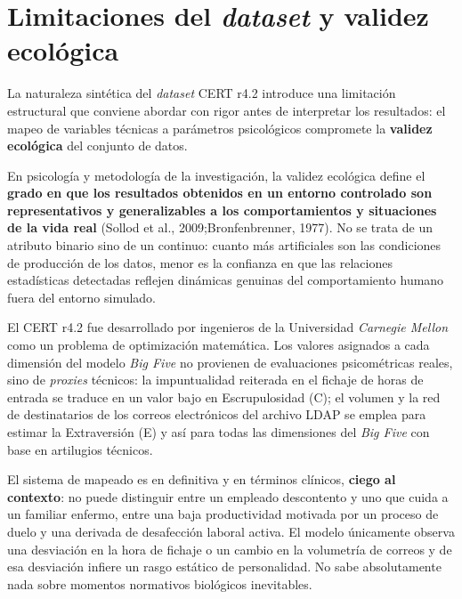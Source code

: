 \documentclass[IB]{TFUOC}%
\begin{document}
\section{Limitaciones del \textit{dataset} y validez ecológica}

La naturaleza sintética del \textit{dataset} CERT r4.2 introduce una limitación 
estructural que conviene abordar con rigor antes de interpretar los resultados: 
el mapeo de variables técnicas a parámetros psicológicos compromete la 
\textbf{validez ecológica} del conjunto de datos.

\medskip
\noindent En psicología y metodología de la investigación, la validez ecológica 
define el \textbf{grado en que los resultados obtenidos en un entorno controlado 
son representativos y generalizables a los comportamientos y situaciones de la 
vida real} (Sollod et al., 2009;Bronfenbrenner, 1977). No se trata de un atributo binario sino de un continuo: cuanto más artificiales son las condiciones de producción de los datos, 
menor es la confianza en que las relaciones estadísticas detectadas reflejen 
dinámicas genuinas del comportamiento humano fuera del entorno simulado.

\medskip
\noindent El CERT r4.2 fue desarrollado por ingenieros de la Universidad 
\textit{Carnegie Mellon} como un problema de optimización matemática. Los valores 
asignados a cada dimensión del modelo \textit{Big Five} no provienen de 
evaluaciones psicométricas reales, sino de \textit{proxies} técnicos: la impuntualidad 
reiterada en el fichaje de horas de entrada se traduce en un valor bajo en Escrupulosidad (C); 
el volumen y la red de destinatarios de los correos electrónicos del archivo 
LDAP se emplea para estimar la Extraversión (E) y así para todas las dimensiones del \textit{Big Five} con base en artilugios técnicos. 

\medskip
\noindent El sistema de mapeado es en definitiva y 
en términos clínicos, \textbf{ciego al contexto}: no puede distinguir entre 
un empleado descontento y uno que cuida a un familiar enfermo, entre una 
baja productividad motivada por un proceso de duelo y una derivada de 
desafección laboral activa. El modelo únicamente observa una desviación 
en la hora de fichaje o un cambio en la volumetría de correos y de esa 
desviación infiere un rasgo estático de personalidad. No sabe absolutamente nada sobre momentos normativos biológicos inevitables.
\end{document}
